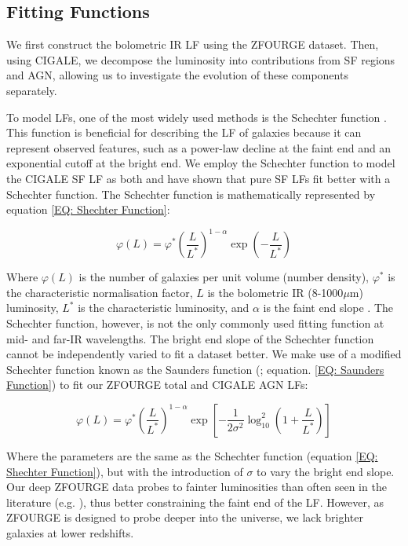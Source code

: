 \subsection{Fitting Functions}
We first construct the bolometric IR LF using the ZFOURGE dataset. Then, using CIGALE, we decompose the luminosity into contributions from SF regions and AGN, allowing us to investigate the evolution of these components separately.

To model LFs, one of the most widely used methods is the Schechter function \citep{schechter_analytic_1976}. This function is beneficial for describing the LF of galaxies because it can represent observed features, such as a power-law decline at the faint end and an exponential cutoff at the bright end. We employ the Schechter function to model the CIGALE SF LF as both \cite{fu_decomposing_2010} and \cite{wu_mid-infrared_2011} have shown that pure SF LFs fit better with a Schechter function. The Schechter function is mathematically represented by equation \ref{EQ: Shechter Function}:

\begin{equation} 
    \varphi(L) = \varphi^* \left(\frac{L}{L^*}\right)^{1-\alpha} \exp\left(-\frac{L}{L^*}\right) 
    \label{EQ: Shechter Function}
\end{equation}

Where $\varphi(L)$ is the number of galaxies per unit volume (number density), $\varphi^*$ is the characteristic normalisation factor, $L$ is the bolometric IR (8-1000$\mu$m) luminosity, $L^*$ is the characteristic luminosity, and $\alpha$ is the faint end slope \citep{schechter_analytic_1976}. The Schechter function, however, is not the only commonly used fitting function at mid- and far-IR wavelengths. The bright end slope of the Schechter function cannot be independently varied to fit a dataset better. We make use of a modified Schechter function known as the Saunders function (\citealp{saunders_60-mum_1990}; equation. \ref{EQ: Saunders Function}) to fit our ZFOURGE total and CIGALE AGN LFs:

\begin{equation} 
    \varphi(L) = \varphi^* \left(\frac{L}{L^*}\right)^{1-\alpha} \exp\left[-\frac{1}{2\sigma^2}\log_{10}^2\left(1+\frac{L}{L^*}\right)\right]
    \label{EQ: Saunders Function}
\end{equation}

Where the parameters are the same as the Schechter function (equation \ref{EQ: Shechter Function}), but with the introduction of $\sigma$ to vary the bright end slope. Our deep ZFOURGE data probes to fainter luminosities than often seen in the literature (e.g. \citealp{rodighiero_mid-_2010, gruppioni_herschel_2013}), thus better constraining the faint end of the LF. However, as ZFOURGE is designed to probe deeper into the universe, we lack brighter galaxies at lower redshifts. 